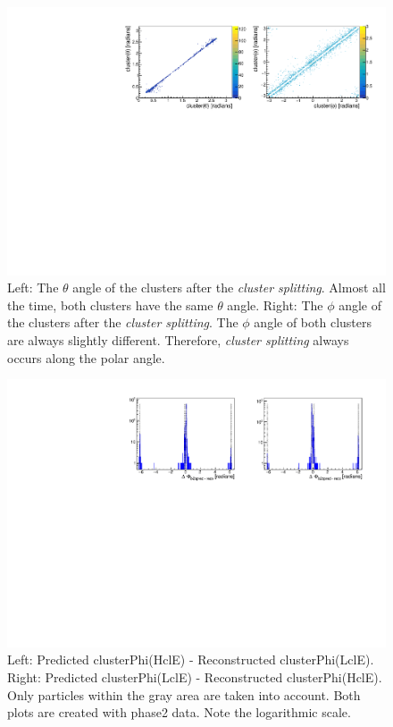 \documentclass[a4paper,11pt,twosided,final,german,openbib,pdftex,listof=totoc,bibliography=totoc]{scrbook}
\begin{document}
\begin{appendix}
\begin{figure}[h!]
	\centering
	\includegraphics[width=\textwidth]{AnhangPlots/ttpp.pdf}
	\caption[Cluster Splitting Angle Distribution]{Left: The $\theta$ angle of the clusters after the \textit{cluster splitting}. Almost all the time, both clusters have the same $\theta$ angle.  Right: The $\phi$ angle of the clusters after the \textit{cluster splitting}. The $\phi$ angle of both clusters are always slightly different. Therefore, \textit{cluster splitting} always occurs along the polar angle.}
	\label{fig:clusterSplittingAngle}
\end{figure}



\begin{figure}[h!]
	\centering
	\includegraphics[width=\textwidth]{Plots/master/sb2b_Data_0.pdf}
	\caption[b2bClusterPhi - clusterPhi For Data (Whole Range)]{Left: Predicted clusterPhi(HclE) - Reconstructed clusterPhi(LclE). Right: Predicted clusterPhi(LclE) - Reconstructed clusterPhi(HclE). Only particles within the gray area are taken into account. Both plots are created with phase2 data. Note the logarithmic scale.}
	\label{fig:b2bData_Whole}
\end{figure}







\end{appendix}
\end{document}
